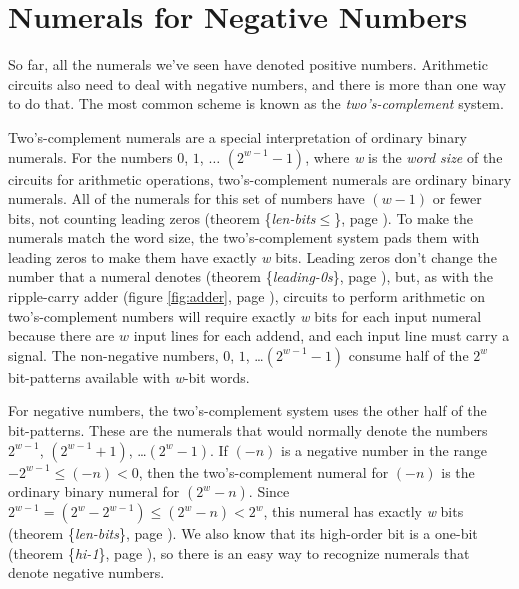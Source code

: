 \section{Numerals for Negative Numbers}
\label{sec:negative-numerals}

So far, all the numerals we've seen have denoted positive numbers.
Arithmetic circuits also need to deal with negative numbers,
and there is more than one way to do that.
The most common scheme is known as the \emph{two's-complement} system.

Two's-complement
numerals are a special interpretation of
ordinary binary numerals.
For the numbers $0$, $1$, $\dots$ $(2^{w-1}-1)$,
where \emph{w} is the \emph{word size}
of the circuits for arithmetic operations,
two's-complement numerals are ordinary binary numerals.
All of the numerals for this set of numbers
have $(w-1)$ or fewer bits,
not counting leading zeros
(theorem \{\emph{len-bits}$\le$\}, page \pageref{len-bitsLE}).
To make the numerals match the word size,
the two's-complement system pads them with leading zeros
to make them have exactly \emph{w} bits.
Leading zeros don't change the number that a numeral denotes
(theorem \{\emph{leading-0s}\}, page \pageref{leading-0s}), but,
as with the ripple-carry adder (figure \ref{fig:adder}, page \pageref{fig:adder}),
circuits to perform arithmetic on two's-complement numbers will
require exactly \emph{w} bits for each input numeral
because there are $w$ input lines for each addend,
and each input line must carry a signal.
The non-negative numbers, $0$, $1$, \dots $(2^{w-1}-1)$
consume half of the $2^w$ bit-patterns available with
\emph{w}-bit words.

For negative numbers,
the two's-complement system uses the other half of the bit-patterns.
These are the numerals that would normally denote the numbers
$2^{w-1}$, $(2^{w-1}+1)$, \dots $(2^{w}-1)$.
If $(-n)$ is a negative number in the range $-2^{w-1} \leq (-n) < 0$,
\label{2s-def}
then the two's-complement numeral for $(-n)$
is the ordinary binary numeral for $(2^w - n)$.
Since $2^{w-1} = (2^{w}-2^{w-1}) \leq (2^w - n) < 2^w$,
this numeral has exactly \emph{w} bits
(theorem \{\emph{len-bits}\}, page \pageref{len-bits}).
We also know that its high-order bit is a one-bit
(theorem \{\emph{hi-1}\}, page \pageref{hi-1}),
so there is an easy way to recognize numerals that denote negative numbers.

